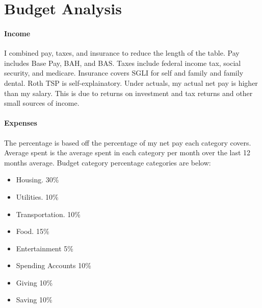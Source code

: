 \section*{Budget Analysis}

\paragraph{Income} I combined pay, taxes, and insurance to reduce the length of the table. Pay includes Base Pay, BAH, and BAS. Taxes include federal income tax, social security, and medicare. Insurance covers SGLI for self and family and family dental. Roth TSP is self-explainatory. Under actuals, my actual net pay is higher than my salary. This is due to returns on investment and tax returns and other small sources of income.

\paragraph{Expenses} The percentage is based off the percentage of my net pay each category covers. Average spent is the average spent in each category per month over the last 12 months average. Budget category percentage categories are below:
\begin{itemize}
        \item Housing. 30\%
        \item Utilities. 10\%
        \item Transportation. 10\%
        \item Food. 15\%
        \item Entertainment 5\%
        \item Spending Accounts 10\%
        \item Giving 10\%
        \item Saving 10\%
\end{itemize}
